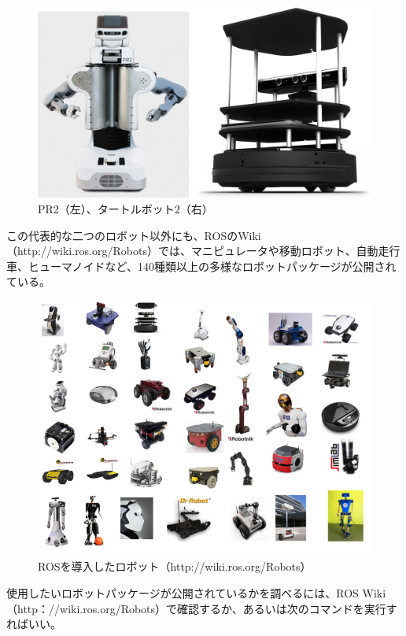 \begin{figure}[htp]
  \centering
  \includegraphics[width=15cm]{pictures/chapter7/pic_07_01.png}
  \caption{ PR2（左）、タートルボット2（右）}
\end{figure}


この代表的な二つのロボット以外にも、ROSのWiki（http://wiki.ros.org/Robots）では、マニピュレータや移動ロボット、自動走行車、ヒューマノイドなど、140種類以上の多様なロボットパッケージが公開されている。

\begin{figure}[htp]
  \centering
  \includegraphics[width=15cm]{pictures/chapter7/pic_07_02.png}
  \caption{ROSを導入したロボット（http://wiki.ros.org/Robots）}
\end{figure}

使用したいロボットパッケージが公開されているかを調べるには、ROS Wiki（http：//wiki.ros.org/Robots）で確認するか、あるいは次のコマンドを実行すればいい。

